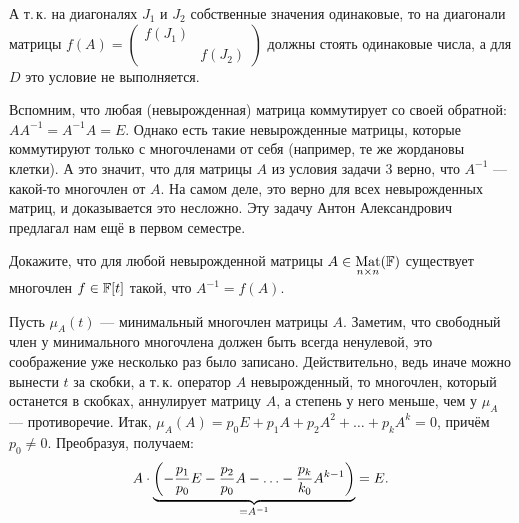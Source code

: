 \begin{solution}
    А т.\,к. на диагоналях $J_1$ и $J_2$ собственные значения одинаковые, то на диагонали матрицы
    $
    f(A) =
    \begin{pmatrix}
        f(J_1) & \\
         & f(J_2)
    \end{pmatrix}
    $ должны стоять одинаковые числа, а для $D$ это условие не выполняется.
\end{solution}

Вспомним, что любая (невырожденная) матрица коммутирует со своей обратной: $AA^{-1} = A^{-1}A = E$. Однако есть такие невырожденные матрицы, которые коммутируют только с многочленами от себя (например, те же жордановы клетки). А это значит, что для матрицы $A$ из условия задачи 3 верно, что $A^{-1}$ --- какой-то многочлен от $A$. На самом деле, это верно для всех невырожденных матриц, и доказывается это несложно. Эту задачу Антон Александрович предлагал нам ещё в первом семестре.

\begin{problem}[А.\,А. Клячко]
    Докажите, что для любой невырожденной матрицы $A \in \underset{n \times n}{\operatorname{Mat}}(\mathbb{F})$ существует многочлен $f \in \mathbb{F}[t]$ такой, что $A^{-1} = f(A)$.
\end{problem}

\begin{solution}
    Пусть $\mu_A(t)$ --- минимальный многочлен матрицы $A$. Заметим, что свободный член у минимального многочлена должен быть всегда ненулевой, это соображение уже несколько раз было записано. Действительно, ведь иначе можно вынести $t$ за скобки, а т.\,к. оператор $A$ невырожденный, то многочлен, который останется в скобках, аннулирует матрицу $A$, а степень у него меньше, чем у $\mu_A$ --- противоречие. Итак, $\mu_A(A) = p_0E + p_1A + p_2A^2 + \ldots + p_kA^k = 0$, причём $p_0 \ne 0$. Преобразуя, получаем:
    \[
        A \cdot \underbrace{\left(-\frac{p_1}{p_0}E - \frac{p_2}{p_0}A - \ldots - \frac{p_k}{k_0}A^{k - 1}\right)}_{{} = A^{-1}} = E.
    \]
\end{solution}


